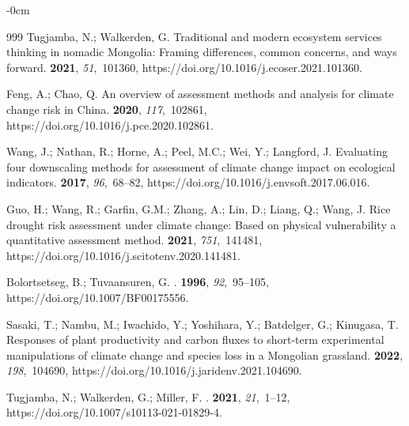 \documentclass[geosciences,article,accept,pdftex,oneauthor]{Definitions/mdpi}
\begin{document}
\begin{adjustwidth}{-\extralength}{0cm}
\begin{thebibliography}{999}
Tugjamba, N.; Walkerden, G.
\newblock Traditional and modern ecosystem services thinking in nomadic
  Mongolia: Framing differences, common concerns, and ways forward.
 {\bf 2021}, {\em 51},~101360, https://doi.org/10.1016/j.ecoser.2021.101360.

Feng, A.; Chao, Q.
\newblock An overview of assessment methods and analysis for climate change
  risk in China.
 {\bf 2020},
  {\em 117},~102861, https://doi.org/10.1016/j.pce.2020.102861.

Wang, J.; Nathan, R.; Horne, A.; Peel, M.C.; Wei, Y.; Langford, J.
\newblock Evaluating four downscaling methods for assessment of climate change
  impact on ecological indicators.
 {\bf 2017}, {\em
  96},~68--82, https://doi.org/10.1016/j.envsoft.2017.06.016.

Guo, H.; Wang, R.; Garfin, G.M.; Zhang, A.; Lin, D.; Liang, Q.; Wang, J.
\newblock Rice drought risk assessment under climate change: Based on physical
  vulnerability a quantitative assessment method.
 {\bf 2021}, {\em 751},~141481, https://doi.org/10.1016/j.scitotenv.2020.141481.

Bolortsetseg, B.; Tuvaansuren, G.
.
 {\bf 1996}, {\em 92},~95--105, https://doi.org/10.1007/BF00175556.

Sasaki, T.; Nambu, M.; Iwachido, Y.; Yoshihara, Y.; Batdelger, G.; Kinugasa, T.
\newblock Responses of plant productivity and carbon fluxes to short-term
  experimental manipulations of climate change and species loss in a Mongolian
  grassland.
 {\bf 2022}, {\em 198},~104690, https://doi.org/10.1016/j.jaridenv.2021.104690.

Tugjamba, N.; Walkerden, G.; Miller, F.
.
 {\bf 2021}, {\em 21},~1--12, https://doi.org/10.1007/s10113-021-01829-4.


\end{thebibliography}
\end{adjustwidth}
\end{document}
